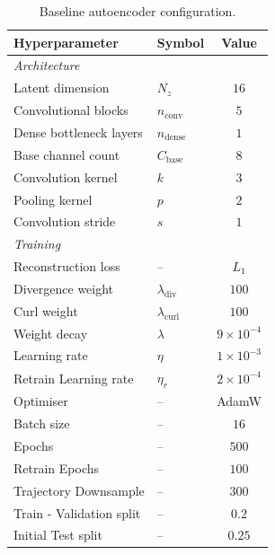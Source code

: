 \begin{table}[H]
    \centering
    
    \begin{tabular}{@{}llc@{}}
        \toprule
        Hyperparameter & Symbol & Value \\
        \midrule
        \multicolumn{3}{l}{\textit{Architecture}} \\
        Latent dimension          & $N_z$            & $16$ \\
        Convolutional blocks      & $n_\text{conv}$  & $5$  \\ %
        Dense bottleneck layers   & $n_\text{dense}$ & $1$  \\ %
        Base channel count        & $C_\text{base}$  & $8$  \\
        Convolution kernel        & $k$              & $3$  \\
        Pooling kernel            & $p$              & $2$  \\
        Convolution stride        & $s$              & $1$  \\
        \midrule
        \multicolumn{3}{l}{\textit{Training}} \\
        Reconstruction loss       & --                      & $L_1$ \\
        Divergence weight         & $\lambda_\text{div}$    & $100$ \\ %
        Curl weight               & $\lambda_\text{curl}$   & $100$ \\
        Weight decay              & $\lambda$               & $9\times10^{-4}$ \\
        Learning rate             & $\eta$                  & $1\times10^{-3}$ \\
        Retrain Learning rate     & $\eta_r$                & $2\times10^{-4}$ \\
        Optimiser                 & --                      & AdamW \\ %
        Batch size                & --                      & $16$  \\
        Epochs                    & --                      & $500$ \\
        Retrain Epochs            & --                      & $100$ \\
        Trajectory Downsample     & --                      & $300$ \\
        Train - Validation split  & --                      & $0.2$ \\
        Initial Test split        & --                      & $0.25$ \\
        \bottomrule
    \end{tabular}
    \caption{Baseline autoencoder configuration.}
    \label{tab: 4_ae_config}
\end{table}

